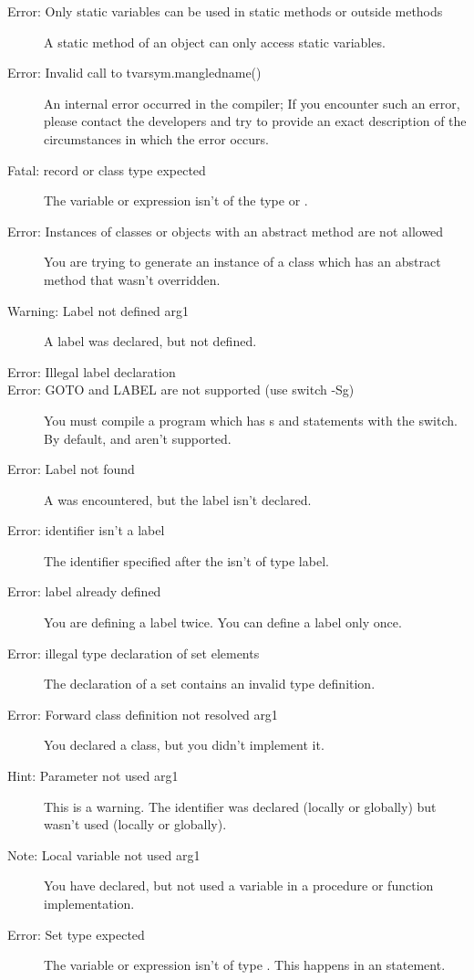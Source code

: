 \begin{description}
\item [Error: Only static variables can be used in static methods or outside methods]
 A static method of an object can only access static variables.
\item [Error: Invalid call to tvarsym.mangledname()]
 An internal error occurred in the compiler; If you encounter such an error,
 please contact the developers and try to provide  an exact description of
 the circumstances in which the error occurs.
\item [Fatal: record or class type expected]
 The variable or expression isn't of the type  or .
\item [Error: Instances of classes or objects with an abstract method are not allowed]
 You are trying to generate an instance of a class which has an abstract
 method that wasn't overridden.
\item [Warning: Label not defined arg1]
 A label was declared, but not defined.
\item [Error: Illegal label declaration]
\item [Error: GOTO and LABEL are not supported (use switch -Sg)]
 You must compile a program which has s and  statements
 with the   switch. By default,  and  aren't
 supported.
\item [Error: Label not found]
 A  was encountered, but the label isn't declared.
\item [Error: identifier isn't a label]
 The identifier specified after the  isn't of type label.
\item [Error: label already defined]
 You are defining a label twice. You can define a label only once.
\item [Error: illegal type declaration of set elements]
 The declaration of a set contains an invalid type definition.
\item [Error: Forward class definition not resolved arg1]
 You declared a class, but you didn't implement it.
\item [Hint: Parameter not used arg1]
 This is a warning. The identifier was declared (locally or globally) but
 wasn't used (locally or globally).
\item [Note: Local variable not used arg1]
 You have declared, but not used a variable in a procedure or function
 implementation.
\item [Error: Set type expected]
 The variable or expression isn't of type . This happens in an
  statement.

\end{description}
